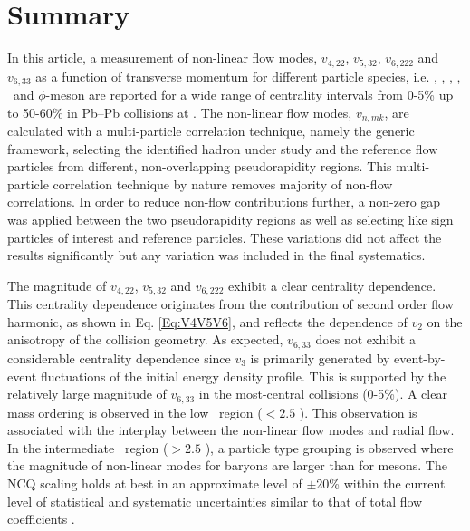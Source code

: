 \documentclass[ALICE,manyauthors]{cernphprep}
\providecommand{\DIFaddtex}[1]{{\protect\color{blue}\uwave{#1}}} %
\providecommand{\DIFdeltex}[1]{{\protect\color{red}\sout{#1}}}                      %
\providecommand{\DIFaddbegin}{} %
\providecommand{\DIFaddend}{} %
\providecommand{\DIFdelbegin}{} %
\providecommand{\DIFdelend}{} %
\providecommand{\DIFadd}[1]{\texorpdfstring{\DIFaddtex{#1}}{#1}} %
\providecommand{\DIFdel}[1]{\texorpdfstring{\DIFdeltex{#1}}{}} %
\begin{document}
\newpage
\newpage

\section{Summary}
\label{Sec:conclusion}

In this article, a measurement of non-linear flow modes, $v_{4,22}$, $v_{5,32}$, $v_{6,222}$ and $v_{6,33}$ as a function of transverse momentum for different particle species, i.e. \pion, \kaon, \proton, \Ks, \lambdas~and $\phi$-meson are reported for a wide range of centrality intervals from 0-5\% up to 50-60\% in Pb--Pb collisions at \sNN. The non-linear flow modes, $v_{n,mk}$, are calculated with a multi-particle correlation technique, namely the generic framework, selecting the identified hadron under study and the reference flow particles from different, non-overlapping pseudorapidity regions. This multi-particle correlation technique by nature removes majority of non-flow correlations. In order to reduce non-flow contributions further, a non-zero gap was applied between the two pseudorapidity regions as well as selecting like sign particles of interest and reference particles. These variations did not affect the results significantly but any variation was included in the final systematics. 

The magnitude of $v_{4,22}$, $v_{5,32}$ and $v_{6,222}$ exhibit a clear centrality dependence. This centrality dependence originates from the contribution of second order flow harmonic, as shown in Eq. \ref{Eq:V4V5V6}, and reflects the dependence of $v_{2}$ on the anisotropy of the collision geometry. As expected, $v_{6,33}$ does not exhibit a considerable centrality dependence since $v_{3}$ is primarily generated by event-by-event fluctuations of the initial energy density profile. This is supported by the relatively large magnitude of $v_{6,33}$ in the most-central collisions (0-5\%). A clear mass ordering is observed in the low \pT~region (\pT$< 2.5$ \GeV). This observation is associated with the interplay between the \DIFdelbegin \DIFdel{non-linear flow modes }\DIFdelend \DIFaddbegin \DIFadd{anisotropic flow }\DIFaddend and radial flow. In the intermediate \pT~region (\pT$> 2.5$ \GeV), a particle type grouping is observed where the magnitude of non-linear modes for baryons are larger than for mesons. The NCQ scaling holds at best in an approximate level of $\pm 20$\% within the current level of statistical and systematic uncertainties similar to that of total flow coefficients \cite{Acharya:2018zuq}.
\end{document}
